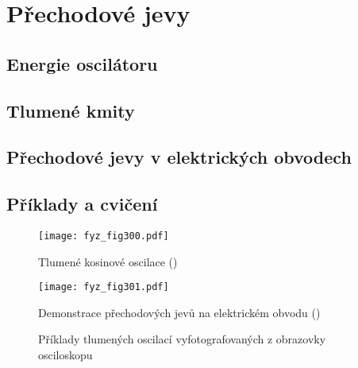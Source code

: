 \setchaptertoc
\chapter{Přechodové jevy}\label{fyz:IchapXXIV}

  \section{Energie oscilátoru}\label{fyz:IchapXXIVsecI}
  \section{Tlumené kmity}\label{fyz:IchapXXIVsecII}
  \section{Přechodové jevy v elektrických obvodech}\label{fyz:IchapXXVIVsecIII}
  \section{Příklady a cvičení}\label{fyz:IchapXXIVsecIV}

    \begin{figure}[ht!] %
      \centering
      \texttt{[image: fyz\_fig300.pdf]}
      \caption{Tlumené kosinové oscilace 
               (\cite[s.~326]{Feynman01})}
      \label{fyz:fig300}
    \end{figure}

    \begin{figure}[ht!] %
      \centering
      \texttt{[image: fyz\_fig301.pdf]}
      \caption{Demonstrace přechodových jevů na elektrickém obvodu 
               (\cite[s.~328]{Feynman01})}
      \label{fyz:fig301}
    \end{figure}
    

    \begin{figure}[ht!]      %
      \centering
               \newline
      \caption{Příklady tlumených oscilací vyfotografovaných z obrazovky osciloskopu
               \cite[s.~329]{Feynman01}}
      \label{fyz:fig302}
    \end{figure}

